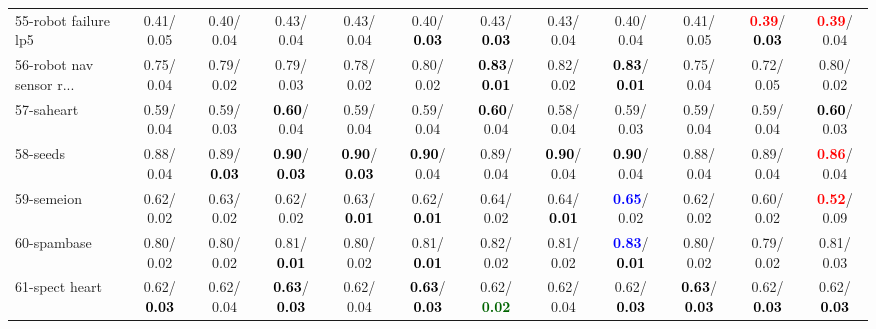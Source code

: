 \begin{table}[h]
\begin{center}
{\begin{tabular}{lc|c|c|c|c|c|c|c|c|c|c}
55-robot failure lp5 &   0.41/  0.05 &   0.40/  0.04 &   0.43/  0.04 &   0.43/  0.04 &   0.40/\textcolor{black}{\textbf{  0.03}} &   0.43/\textcolor{black}{\textbf{  0.03}} &   0.43/  0.04 &   0.40/  0.04 &   0.41/  0.05 & \textcolor{red}{\textbf{  0.39}}/\textcolor{black}{\textbf{  0.03}} & \textcolor{red}{\textbf{  0.39}}/  0.04 \\
56-robot nav sensor r... &   0.75/  0.04 &   0.79/  0.02 &   0.79/  0.03 &   0.78/  0.02 &   0.80/  0.02 & \textcolor{black}{\textbf{  0.83}}/\textcolor{black}{\textbf{  0.01}} &   0.82/  0.02 & \textcolor{black}{\textbf{  0.83}}/\textcolor{black}{\textbf{  0.01}} &   0.75/  0.04 &   0.72/  0.05 &   0.80/  0.02 \\
57-saheart &   0.59/  0.04 &   0.59/  0.03 & \textcolor{black}{\textbf{  0.60}}/  0.04 &   0.59/  0.04 &   0.59/  0.04 & \textcolor{black}{\textbf{  0.60}}/  0.04 &   0.58/  0.04 &   0.59/  0.03 &   0.59/  0.04 &   0.59/  0.04 & \textcolor{black}{\textbf{  0.60}}/  0.03 \\
58-seeds &   0.88/  0.04 &   0.89/\textcolor{black}{\textbf{  0.03}} & \textcolor{black}{\textbf{  0.90}}/\textcolor{black}{\textbf{  0.03}} & \textcolor{black}{\textbf{  0.90}}/\textcolor{black}{\textbf{  0.03}} & \textcolor{black}{\textbf{  0.90}}/  0.04 &   0.89/  0.04 & \textcolor{black}{\textbf{  0.90}}/  0.04 & \textcolor{black}{\textbf{  0.90}}/  0.04 &   0.88/  0.04 &   0.89/  0.04 & \textcolor{red}{\textbf{  0.86}}/  0.04 \\
59-semeion &   0.62/  0.02 &   0.63/  0.02 &   0.62/  0.02 &   0.63/\textcolor{black}{\textbf{  0.01}} &   0.62/\textcolor{black}{\textbf{  0.01}} &   0.64/  0.02 &   0.64/\textcolor{black}{\textbf{  0.01}} & \textcolor{blue}{\textbf{  0.65}}/  0.02 &   0.62/  0.02 &   0.60/  0.02 & \textcolor{red}{\textbf{  0.52}}/  0.09 \\
60-spambase &   0.80/  0.02 &   0.80/  0.02 &   0.81/\textcolor{black}{\textbf{  0.01}} &   0.80/  0.02 &   0.81/\textcolor{black}{\textbf{  0.01}} &   0.82/  0.02 &   0.81/  0.02 & \textcolor{blue}{\textbf{  0.83}}/\textcolor{black}{\textbf{  0.01}} &   0.80/  0.02 &   0.79/  0.02 &   0.81/  0.03 \\ \hline
61-spect heart &   0.62/\textcolor{black}{\textbf{  0.03}} &   0.62/  0.04 & \textcolor{black}{\textbf{  0.63}}/\textcolor{black}{\textbf{  0.03}} &   0.62/  0.04 & \textcolor{black}{\textbf{  0.63}}/\textcolor{black}{\textbf{  0.03}} &   0.62/\textcolor{darkgreen}{\textbf{  0.02}} &   0.62/  0.04 &   0.62/\textcolor{black}{\textbf{  0.03}} & \textcolor{black}{\textbf{  0.63}}/\textcolor{black}{\textbf{  0.03}} &   0.62/\textcolor{black}{\textbf{  0.03}} &   0.62/\textcolor{black}{\textbf{  0.03}} \\

\end{tabular}}
\end{center}
\end{table}

